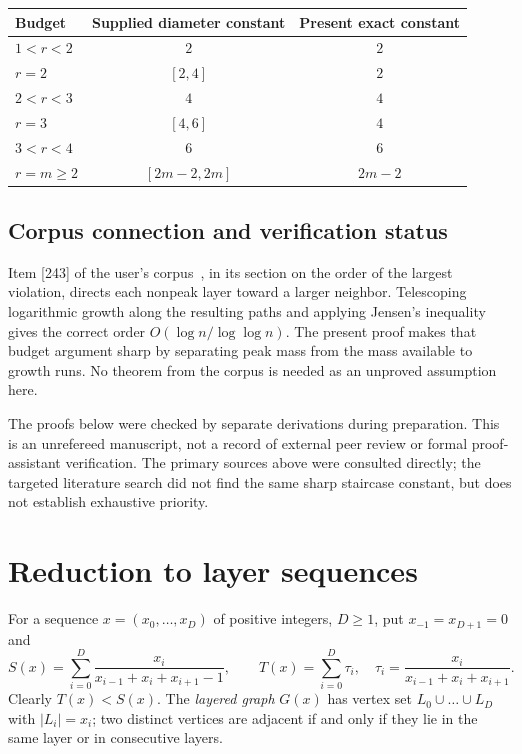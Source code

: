 \documentclass[11pt]{amsart}
\theoremstyle{definition}
\theoremstyle{remark}
\begin{document}
\begin{center}
\begin{tabular}{@{}lcc@{}}
\toprule
Budget & Supplied diameter constant & Present exact constant\\
\midrule
$1<r<2$ & $2$ & $2$\\
$r=2$ & $[2,4]$ & $2$\\
$2<r<3$ & $4$ & $4$\\
$r=3$ & $[4,6]$ & $4$\\
$3<r<4$ & $6$ & $6$\\
$r=m\ge2$ & $[2m-2,2m]$ & $2m-2$\\
\bottomrule
\end{tabular}
\end{center}

\subsection*{Corpus connection and verification status}
Item [243] of the user's corpus~\cite{Corpus243}, in its section on the
order of the largest violation, directs each nonpeak layer toward a larger
neighbor. Telescoping logarithmic growth along the resulting paths and
applying Jensen's inequality gives the correct order
$O(\log n/\log\log n)$. The present proof makes that budget argument sharp
by separating peak mass from the mass available to growth runs. No theorem
from the corpus is needed as an unproved assumption here.

The proofs below were checked by separate derivations during preparation.
This is an unrefereed manuscript, not a record of external peer review or
formal proof-assistant verification. The primary sources above were
consulted directly; the targeted literature search did not find the same
sharp staircase constant, but does not establish exhaustive priority.
\section{Reduction to layer sequences}

For a sequence $x=(x_0,\dots,x_D)$ of positive integers, $D\ge1$, put $x_{-1}=x_{D+1}=0$ and
\[
S(x)=\sum_{i=0}^{D}\frac{x_i}{x_{i-1}+x_i+x_{i+1}-1},\qquad
T(x)=\sum_{i=0}^{D}\tau_i,\quad \tau_i=\frac{x_i}{x_{i-1}+x_i+x_{i+1}} .
\]
Clearly $T(x)<S(x)$.
The \emph{layered graph} $G(x)$ has vertex set $L_0\cup\dots\cup L_D$ with $|L_i|=x_i$; two distinct vertices are adjacent if and only if they lie in the same layer or in consecutive layers.
\end{document}
